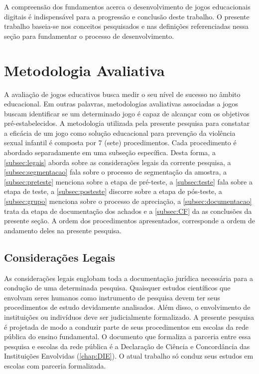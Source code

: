 A compreensão dos fundamentos acerca o desenvolvimento de jogos educacionais digitais é indispensável para a progressão e conclusão deste trabalho. O presente trabalho baseia-se nos conceitos pesquisados e nas definições referenciadas nessa seção para fundamentar o processo de desenvolvimento.


\section{Metodologia Avaliativa}\label{sec:Avaliativos}

A avaliação de jogos educativos busca medir o seu nível de sucesso no âmbito educacional. Em outras palavras, metodologias avaliativas associadas a jogos buscam identificar se um determinado jogo é capaz de alcançar com os objetivos pré-estabelecidos. A metodologia utilizada pela presente pesquisa para constatar a eficácia de um jogo como solução educacional para prevenção da violência sexual infantil é composta por 7 (sete) procedimentos. Cada procedimento é abordado separadamente em uma subseção específica. Desta forma, a \autoref{subsec:legais} aborda sobre as considerações legais da corrente pesquisa, a \autoref{subsec:segmentacao} fala sobre o processo de segmentação da amostra, a \autoref{subsec:preteste} menciona sobre a etapa de pré-teste, a \autoref{subsec:teste} fala sobre a etapa de teste, a \autoref{subsec:posteste} discorre sobre a etapa de pós-teste, a \autoref{subsec:grupo} menciona sobre o processo de apreciação, a \autoref{subsec:documentacao} trata da etapa de documentação dos achados e a \autoref{subsec:CF} da as conclusões da presente seção. A ordem dos procedimentos apresentados, corresponde a ordem de andamento deles na presente pesquisa. 

\subsection{Considerações Legais}\label{subsec:legais}

As considerações legais englobam toda a documentação jurídica necessária para a condução de uma determinada pesquisa. Quaisquer estudos científicos que envolvam seres humanos como instrumento de pesquisa devem ter seus procedimentos de estudo devidamente analisados. Além disso, o envolvimento de instituições ou indivíduos deve ser judicialmente formalizado. A presente pesquisa é projetada de modo a conduzir parte de seus procedimentos em escolas da rede pública do ensino fundamental. O documento que formaliza a parceria entre essa pesquisa e escolas da rede pública é a Declaração de Ciência e Concordância das Instituições Envolvidas (\autoref{chap:DIE}). O atual trabalho só conduz seus estudos em escolas com parceria formalizada.  

